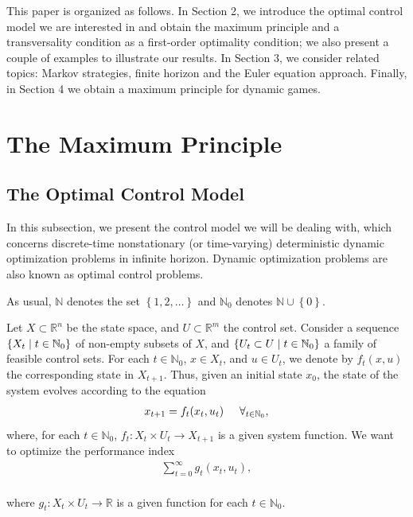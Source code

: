 \documentclass[3p]{elsarticle}
\newcommand{\rzn}{\mathbb R^{n}}
\newcommand{\rz}{\mathbb R}
\newcommand{\rzm}{\mathbb R^{m}}
\newcommand{\nat}{\mathbb N_0}
\newcommand{\natu}{\mathbb N}
\begin{document}
	This paper is organized as follows. In Section 2, we introduce the optimal control model we are interested in and obtain the maximum principle and a transversality condition as a first-order optimality condition; we also present a couple of examples to illustrate our results. In Section 3, we consider related topics: Markov strategies, finite horizon and the Euler equation approach. Finally, in Section 4 we obtain a maximum principle for dynamic games. 
	
	
	
	
	
	
	\section{The Maximum Principle}\label{MPSec}
	\subsection{The Optimal Control Model}\label{olmodel}
	
	In this subsection, we present the control model we will be dealing with, which concerns discrete-time  nonstationary  (or  time-varying) deterministic dynamic optimization problems in infinite horizon. Dynamic optimization problems are also known as optimal control problems. 
	
	As usual,  $\natu$ denotes the set $\left\lbrace 1,2,\dots \right\rbrace $ and $\nat$ denotes $\natu\cup\left\lbrace 0\right\rbrace .$
	
	Let $X\subset\rzn$ be the state space, and $U\subset\rzm$ the control set. Consider a sequence $\left\lbrace X_t\hspace{0.1cm}|\hspace{0.1cm} t\in\nat\right\rbrace$ of non-empty subsets of $X$, and  $\left\lbrace U_t\subset U\hspace{0.1cm}|\hspace{0.1cm} t\in\nat\right\rbrace $ a family of feasible control sets. For each $t\in\nat$, $x\in X_t$, and $u\in U_t$, we denote by $f_t(x,u)$ the corresponding state in $X_{t+1}$. Thus, given an initial state $x_0$, the state of the system evolves according to the equation
	\begin{align}\label{dynamic}
	x_{t+1}=f_t(x_t,u_t) \hspace{.5cm}\forall_{t\in\nat},
	\end{align}
	where, for each $t\in\nat$, $f_t:X_t\times U_t\to X_{t+1}$ is a given system function. We want to optimize the performance index
	\begin{align}\label{Performanceindex}
	\sum_{t=0}^{\infty}g_t(x_t,u_t),
	\end{align}
	\\
	where $g_t:X_t\times U_t\to\rz$ is a given function for each $t\in\nat$. 
	
\end{document}
